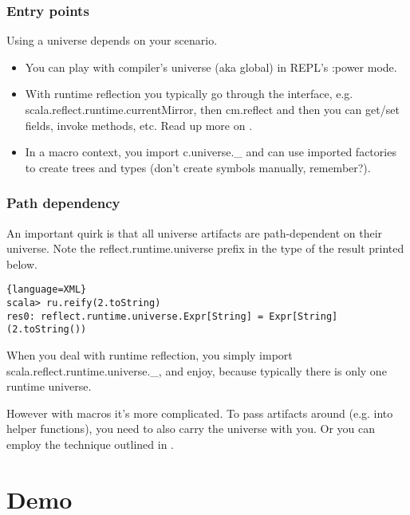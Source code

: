 \documentclass[hyperref={bookmarks=false}]{beamer}
\begin{document}
\begin{frame}[fragile]
\frametitle{Entry points}

Using a universe depends on your scenario.

\begin{itemize}
\item You can play with compiler's universe (aka global) in REPL's :power mode.
\item With runtime reflection you typically go through the 
interface, e.g. scala.reflect.runtime.currentMirror, then cm.reflect and then you can get/set fields, invoke methods, etc. Read up more on .
\item In a macro context, you import c.universe.\_ and can use imported factories to create trees and types (don't create symbols manually, remember?).
\end{itemize}
\end{frame}

\begin{frame}[fragile]
\frametitle{Path dependency}

An important quirk is that all universe artifacts are path-dependent on their universe.
Note the reflect.runtime.universe prefix in the type of the result printed below.

\begin{lstlisting}{language=XML}
scala> ru.reify(2.toString)
res0: reflect.runtime.universe.Expr[String] = Expr[String](2.toString())
\end{lstlisting}

When you deal with runtime reflection, you simply import scala.reflect.runtime.universe.\_, and enjoy,
because typically there is only one runtime universe.

However with macros it's more complicated. To pass artifacts around (e.g. into helper functions),
you need to also carry the universe with you. Or you can employ the technique outlined in
.
\end{frame}

\section{Demo}
\end{document}
